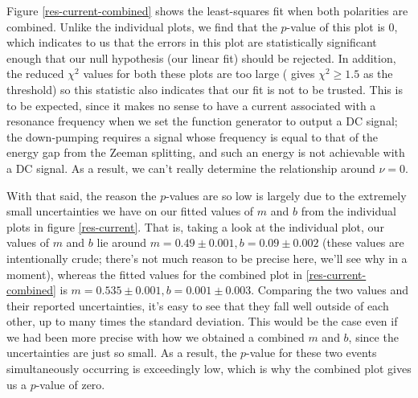 \documentclass[10pt]{article}
\begin{document}
	Figure
	\ref{res-current-combined} shows the least-squares fit when both polarities are
	combined.
	Unlike the individual plots, we find that the \( p
	\)-value of this plot is 0, which indicates to us that the errors in this plot
	are statistically significant enough that our null hypothesis (our linear fit) 
	should be rejected. In addition, the reduced \( \chi^2 \) values for both these
	plots are too large (\cite{hughesMeasurementsTheirUncertainties} gives \( \chi^2
	\geq 1.5 \) as the threshold) so this statistic also indicates that our fit is 
	not to be trusted.    
	This is to be expected, since it makes no sense to have a current associated with
	a resonance frequency when we set the function generator to output a DC signal;
	the down-pumping requires a signal whose frequency is equal to that of the energy
	gap from the Zeeman splitting, and such an energy is not achievable with a DC
	signal. As a result, we can't really determine the relationship around \( \nu = 0
	\).      

	With that said, the reason the \( p \)-values are so low is largely due to the
	extremely small uncertainties we have on our fitted values of \( m \) and \( b \)
	from the individual plots in figure \ref{res-current}. That is, taking a look at
	the  individual plot, our values of \( m \) and \( b \) lie around \(
	m = 0.49 \pm 0.001, b = 0.09 \pm 0.002 \) (these values are intentionally crude;
	there's not much reason to be precise here, we'll see why in a moment), 
	whereas the fitted values for the
	combined plot in \ref{res-current-combined} is \( m = 0.535 \pm 0.001, b = 0.001
	\pm 0.003 \). Comparing the two values and their reported uncertainties, it's
	easy to see that they fall well outside of each other, up to many times the
	standard deviation. This would be the case even if we had been more precise with
	how we obtained a combined \( m \) and \( b \), since the uncertainties are just
	so small. As a result, the \( p \)-value for these two events
	simultaneously occurring is exceedingly low, which is why the combined plot gives
	us a \( p \)-value of zero.     
\end{document}
